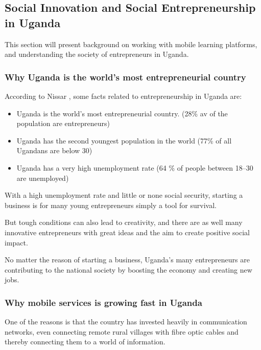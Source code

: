 \subsection{Social Innovation and Social Entrepreneurship in Uganda} %

    This section will present background on working with mobile learning platforms, and understanding the society of entrepreneurs in Uganda.

    \subsubsection{Why Uganda is the world's most entrepreneurial country}
    According to Nissar \cite{nissar}, some facts related to entrepreneurship in Uganda are:

    \begin{itemize}
      \item Uganda is the world's most entrepreneurial country. (28\% av of the population are entrepreneurs)
        \item Uganda has the second youngest population in the world (77\% of all Ugandans are below 30)
        \item Uganda has a very high unemployment rate (64 \% of people between 18–30 are unemployed)
    \end{itemize}


    With a high unemployment rate and little or none social security, starting a business is for many young entrepreneurs simply a tool for survival.

    But tough conditions can also lead to creativity, and there are as well many innovative entrepreneurs with great ideas and the aim to create positive social impact.

    No matter the reason of starting a business, Uganda's many entrepreneurs are contributing to the national society by boosting the economy and creating new jobs.

    \subsubsection{Why mobile services is growing fast in Uganda}
    One of the reasons is that the country has invested heavily in communication networks, even connecting remote rural villages with fibre optic cables and thereby connecting them to a world of information.

